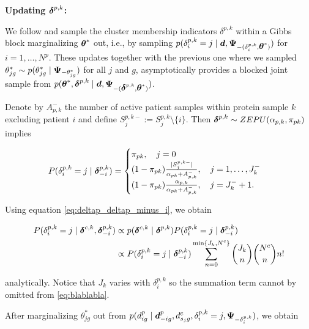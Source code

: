 \textbf{Updating $\mbox{\boldmath $\delta$}^{p,k}$:}


We follow \cite{bush1996} and sample the cluster membership indicators $\delta^{p,k}$ within a Gibbs block marginalizing $\mbox{\boldmath $\theta$}^*$ out, i.e., by sampling $p(\delta^{p,k}_i=j \mid \mbox{\boldmath $d$}, \mbox{\boldmath $\Psi$}_{-(\delta^{p,k}_i, \mbox{\boldmath $\theta$}^*)})$ for $i=1, \ldots, N^p$. These updates together with the previous one where we sampled $\theta^*_{jg} \sim p(\theta^*_{jg} \mid \mbox{\boldmath $\Psi$}_{-\theta^*_{jg}})$ for all $j$ and $g$, asymptotically provides a blocked joint sample from  $p(\mbox{\boldmath $\theta$}^*, \mbox{\boldmath $\delta$}^{p,k} \mid \mbox{\boldmath $d$}, \mbox{\boldmath $\Psi$}_{-(\mbox{\boldmath $\delta$}^{p,k}, \mbox{\boldmath $\theta$}^*)})$.

Denote by $A^-_{p,k}$ the number of active patient samples within protein sample $k$ excluding patient $i$ and define $S^{p,k-}_j:=S^{p,k}_j\setminus\{i\}$. Then $\mbox{\boldmath $\delta$}^{p,k}\sim ZEPU(\alpha_{p,k}, \pi_{pk})$ implies

\begin{equation}
P(\delta^{p,k}_i = j \mid \bfdelta^{p,k}_{-i}) = 
\begin{cases}
\pi_{pk}, \ \ \ j=0\\
(1 - \pi_{pk})\frac{ |S^{p,k-}_j | }{ \alpha_{pk} + A^-_{p,k}}, \ \ \ j=1, \ldots, J^-_k \\
(1 - \pi_{pk})\frac{\alpha_{p,k}}{\alpha_{pk} + A^-_{p,k}}, \ \ \ j = J^-_k + 1.
\end{cases}
\label{eq:deltap_deltap_minus_i}
\end{equation}

Using equation \eqref{eq:deltap_deltap_minus_i}, we obtain 

\begin{align}
P(\delta^{p,k}_i = j \mid \mbox{\boldmath $\delta$}^{c,k}, \mbox{\boldmath $\delta$}^{p,k}_{-i})&\propto p(\mbox{\boldmath $\delta$}^{c,k} \mid \mbox{\boldmath $\delta$}^{p,k})P(\delta^{p,k}_i = j \mid \mbox{\boldmath $\delta$}^{p,k}_{-i}) \nonumber \\
&\propto P(\delta^{p,k}_i = j \mid \mbox{\boldmath $\delta$}^{p,k}_{-i})\sum^{ \min\{J_k, N^c\} }_{n=0} {J_k \choose n} {{N^c}\choose n} n!
\label{eq:blablabla}
\end{align}

\noindent analytically.  Notice that $J_k$ varies with $\delta^{p,k}_i$ so the summation term cannot by omitted from \eqref{eq:blablabla}.

After marginalizing $\theta^*_{jg}$ out from $p(d^p_{ig} \mid \mbox{\boldmath $d$}^p_{-i g}, d^c_{s_j g}, \delta^{p,k}_i=j, \mbox{\boldmath $\Psi$}_{-\delta^{p,k}_i})$, we obtain

